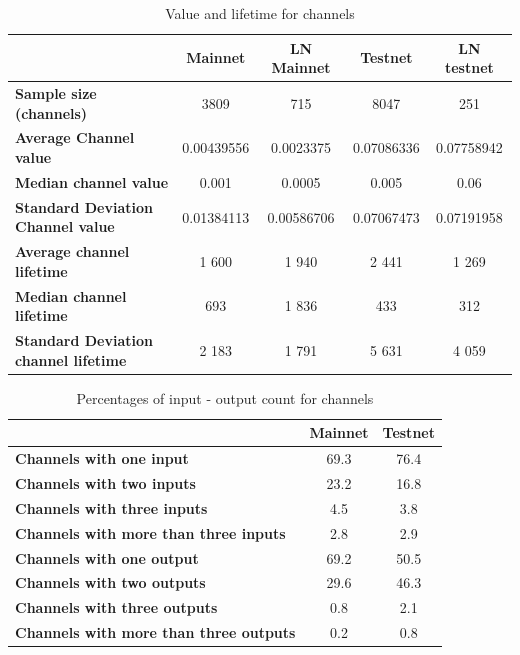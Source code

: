 \begin{table}[ht]
\centering
\caption{Value and lifetime for channels}
\label{subgraph_stats}
\begin{tabular}{l|c|c|c|c}
                                              & \textbf{Mainnet} & \textbf{LN Mainnet}& \textbf{Testnet} & \textbf{LN testnet} \\ \hline
\textbf{Sample size (channels)}              & 3809             & 715           & 8047                     & 251            \\ \hline
\textbf{Average Channel value}               & 0.00439556     & 0.0023375        & 0.07086336            & 0.07758942       \\ \hline
\textbf{Median channel value}                & 0.001         & 0.0005             & 0.005            & 0.06        \\ \hline
\textbf{Standard Deviation Channel value}    & 0.01384113       & 0.00586706      & 0.07067473            & 0.07191958        \\ \hline
\textbf{Average channel lifetime}            & 1 600            & 1 940           & 2 441                & 1 269            \\ \hline
\textbf{Median channel lifetime }             & 693              & 1 836             & 433                  & 312              \\ \hline
\textbf{Standard Deviation channel lifetime} & 2 183            & 1 791           & 5 631                & 4 059            \\ \hline
\end{tabular}
\end{table}

\begin{table}[ht]
\centering
\caption{Percentages of input - output count for channels}
\label{channel_input_output}
\begin{tabular}{l|c|c}
                                                                      & \textbf{Mainnet} & \textbf{Testnet} \\ \hline
\textbf{Channels with one input}             & 69.3            & 76.4            \\ \hline
\textbf{Channels with two inputs}            & 23.2            & 16.8            \\ \hline
\textbf{Channels with three inputs}          & 4.5             & 3.8             \\ \hline
\textbf{Channels with more than three inputs} & 2.8             & 2.9             \\ \hline
\textbf{Channels with one output}             & 69.2            & 50.5            \\ \hline
\textbf{Channels with two outputs}             & 29.6            & 46.3            \\ \hline
\textbf{Channels with three outputs}            & 0.8             & 2.1             \\ \hline
\textbf{Channels with more than three outputs} & 0.2             & 0.8             \\ \hline
\end{tabular}
\end{table}

